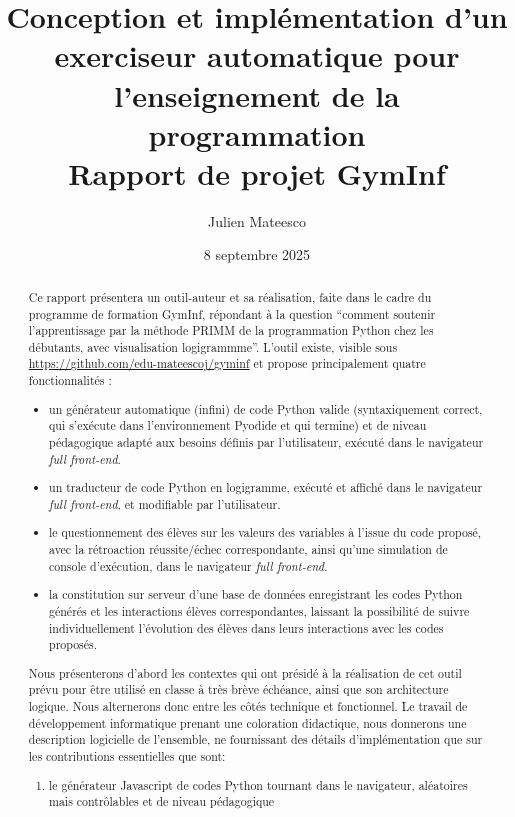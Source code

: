 \documentclass[11pt,a4paper]{article}
\title{\textbf{Conception et implémentation d'un exerciseur automatique pour l'enseignement de la programmation} \\[5mm] Rapport de projet GymInf}
\author{Julien Mateesco}
\date{8 septembre 2025}
\begin{document}
\begin{titlepage}

\maketitle

\begin{abstract}
Ce rapport présentera un outil-auteur et sa réalisation, faite dans le cadre du programme de formation GymInf, répondant à la question ``comment soutenir l'apprentissage par la méthode PRIMM de la programmation Python chez les débutants, avec visualisation logigrammme''. L'outil existe, visible sous \url{https://github.com/edu-mateescoj/gyminf} et propose principalement quatre fonctionnalités :
\begin{itemize}
    \item[\ding{51}] un générateur automatique (infini) de code Python valide (syntaxiquement correct, qui s'exécute dans l'environnement Pyodide et qui termine) et de niveau pédagogique adapté aux besoins définis par l'utilisateur, exécuté dans le navigateur \textit{full front-end}.
    \item[\ding{51}] un traducteur de code Python en logigramme, exécuté et affiché dans le navigateur \textit{full front-end}, et modifiable par l'utilisateur.
    \item[\ding{51}] le questionnement des élèves sur les valeurs des variables à l'issue du code proposé, avec la rétroaction réussite/échec correspondante, ainsi qu'une simulation de console d'exécution, dans le navigateur \textit{full front-end}.
    \item[\ding{51}] la constitution sur serveur d'une base de données enregistrant les codes Python générés et les interactions élèves correspondantes, laissant la possibilité de suivre individuellement l'évolution des élèves dans leurs interactions avec les codes proposés.
\end{itemize}   
Nous présenterons d'abord les contextes qui ont présidé à la réalisation de cet outil prévu pour être utilisé en classe à très brève échéance, ainsi que son architecture logique. Nous alternerons donc entre les côtés technique et fonctionnel. Le travail de développement informatique prenant une coloration didactique, nous donnerons une description logicielle de l'ensemble, ne fournissant des détails d'implémentation que sur les contributions essentielles que sont: \begin{enumerate}
    \item le générateur Javascript de codes Python tournant dans le navigateur, aléatoires mais contrôlables et de niveau pédagogique

\end{enumerate}
\end{abstract}
\end{titlepage}
\end{document}
